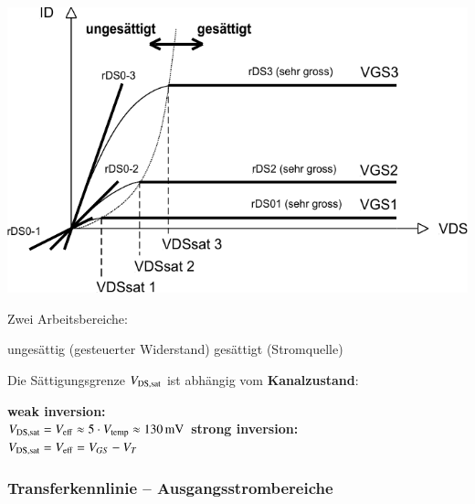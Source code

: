 \begin{minipage}[t]{0.5\columnwidth}
    \includegraphics[width=\columnwidth, align=t]{images/MOSFET_ausgangskennlinien.pdf}
\end{minipage}
\hfill
\begin{minipage}[t]{0.48\columnwidth}
    Zwei Arbeitsbereiche: 

    \begin{outline}
        \1 ungesättig (gesteuerter Widerstand)
        \1 gesättigt (Stromquelle)
    \end{outline}

    \medskip

    Die Sättigungsgrenze $V_{\rm DS, sat}$ ist abhängig vom \textbf{Kanalzustand}:

    \begin{outline}
        \1 \textbf{weak inversion:} \\
            $V_{\rm DS, sat} = V_{\rm eff} \approx 5 \cdot V_{\rm temp} \approx \qty{130}{\milli \volt}$ 
        \1 \textbf{strong inversion:} \\
            $V_{\rm DS, sat} = V_{\rm eff} = V_{GS} - V_T$ 
    \end{outline}
\end{minipage}



\subsubsection{Transferkennlinie -- Ausgangsstrombereiche}


